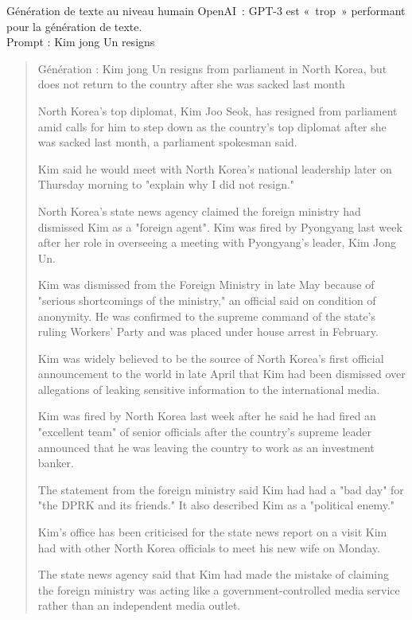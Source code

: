 \begin{frame}{Génération de texte au niveau humain}
  OpenAI~: GPT-3 est «~trop~» performant pour la génération de texte.\\

  Prompt : Kim jong Un resigns

  \begin{quote}
    Génération : Kim jong Un resigns from parliament in North Korea, but does not return to the country after she was sacked last month
      
    North Korea's top diplomat, Kim Joo Seok, has resigned from parliament amid calls for him to step down as the country's top diplomat after she was sacked last month, a parliament spokesman said.
    
    Kim said he would meet with North Korea's national leadership later on Thursday morning to "explain why I did not resign."
    
    North Korea's state news agency claimed the foreign ministry had dismissed Kim as a "foreign agent". Kim was fired by Pyongyang last week after her role in overseeing a meeting with Pyongyang's leader, Kim Jong Un.
    
    Kim was dismissed from the Foreign Ministry in late May because of "serious shortcomings of the ministry," an official said on condition of anonymity. He was confirmed to the supreme command of the state's ruling Workers' Party and was placed under house arrest in February.
    
    Kim was widely believed to be the source of North Korea's first official announcement to the world in late April that Kim had been dismissed over allegations of leaking sensitive information to the international media.
    
    Kim was fired by North Korea last week after he said he had fired an "excellent team" of senior officials after the country's supreme leader announced that he was leaving the country to work as an investment banker.
    
    The statement from the foreign ministry said Kim had had a "bad day" for "the DPRK and its friends." It also described Kim as a "political enemy."
    
    Kim's office has been criticised for the state news report on a visit Kim had with other North Korea officials to meet his new wife on Monday.
    
    The state news agency said that Kim had made the mistake of claiming the foreign ministry was acting like a government-controlled media service rather than an independent media outlet.
    

\end{quote}
\end{frame}
